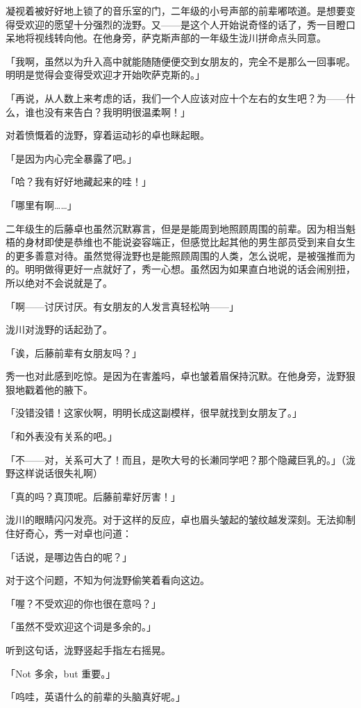 \documentclass[UTF8]{ctexart}
\begin{document}
    凝视着被好好地上锁了的音乐室的门，二年级的小号声部的前辈嘟哝道。是想要变得受欢迎的愿望十分强烈的泷野。又——是这个人开始说奇怪的话了，秀一目瞪口呆地将视线转向他。在他身旁，萨克斯声部的一年级生泷川拼命点头同意。

    「我啊，虽然以为升入高中就能随随便便交到女朋友的，完全不是那么一回事呢。明明是觉得会变得受欢迎才开始吹萨克斯的。」

    「再说，从人数上来考虑的话，我们一个人应该对应十个左右的女生吧？为——什么，谁也没有来告白？我明明很温柔啊！」

    对着愤慨着的泷野，穿着运动衫的卓也眯起眼。

    「是因为内心完全暴露了吧。」

    「哈？我有好好地藏起来的哇！」

    「哪里有啊……」

    二年级生的后藤卓也虽然沉默寡言，但是是能周到地照顾周围的前辈。因为相当魁梧的身材即使是恭维也不能说姿容端正，但感觉比起其他的男生部员受到来自女生的更多善意对待。虽然觉得泷野也是能照顾周围的人类，怎么说呢，是被强推而为的。明明做得更好一点就好了，秀一心想。虽然因为如果直白地说的话会闹别扭，所以绝对不会说就是了。

    「啊——讨厌讨厌。有女朋友的人发言真轻松呐——」

    泷川对泷野的话起劲了。

    「诶，后藤前辈有女朋友吗？」

    秀一也对此感到吃惊。是因为在害羞吗，卓也皱着眉保持沉默。在他身旁，泷野狠狠地戳着他的腋下。

    「没错没错！这家伙啊，明明长成这副模样，很早就找到女朋友了。」

    「和外表没有关系的吧。」

    「不——对，关系可大了！而且，是吹大号的长濑同学吧？那个隐藏巨乳的。」（泷野这样说话很失礼啊）

    「真的吗？真顶呢。后藤前辈好厉害！」

    泷川的眼睛闪闪发亮。对于这样的反应，卓也眉头皱起的皱纹越发深刻。无法抑制住好奇心，秀一对卓也问道：

    「话说，是哪边告白的呢？」

    对于这个问题，不知为何泷野偷笑着看向这边。

    「喔？不受欢迎的你也很在意吗？」

    「虽然不受欢迎这个词是多余的。」

    听到这句话，泷野竖起手指左右摇晃。

    「Not 多余，but 重要。」

    「呜哇，英语什么的前辈的头脑真好呢。」
\end{document}
